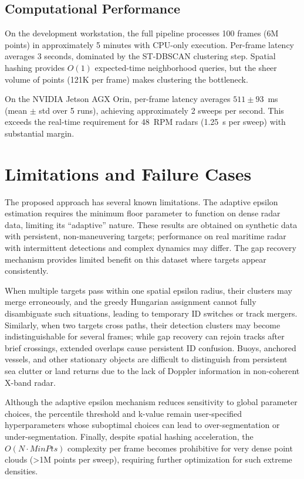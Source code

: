 \documentclass[conf]{new-aiaa}
\begin{document}
\subsection{Computational Performance}

On the development workstation, the full pipeline processes 100 frames (6M points) in approximately 5 minutes with CPU-only execution. Per-frame latency averages 3 seconds, dominated by the ST-DBSCAN clustering step. Spatial hashing provides $O(1)$ expected-time neighborhood queries, but the sheer volume of points (121K per frame) makes clustering the bottleneck.

On the NVIDIA Jetson AGX Orin, per-frame latency averages $511 \pm 93$~ms (mean $\pm$ std over 5 runs), achieving approximately 2 sweeps per second. This exceeds the real-time requirement for 48~RPM radars (1.25~s per sweep) with substantial margin.

\section{Limitations and Failure Cases}

The proposed approach has several known limitations. The adaptive epsilon estimation requires the minimum floor parameter to function on dense radar data, limiting its ``adaptive'' nature. These results are obtained on synthetic data with persistent, non-maneuvering targets; performance on real maritime radar with intermittent detections and complex dynamics may differ. The gap recovery mechanism provides limited benefit on this dataset where targets appear consistently.

When multiple targets pass within one spatial epsilon radius, their clusters may merge erroneously, and the greedy Hungarian assignment cannot fully disambiguate such situations, leading to temporary ID switches or track mergers. Similarly, when two targets cross paths, their detection clusters may become indistinguishable for several frames; while gap recovery can rejoin tracks after brief crossings, extended overlaps cause persistent ID confusion. Buoys, anchored vessels, and other stationary objects are difficult to distinguish from persistent sea clutter or land returns due to the lack of Doppler information in non-coherent X-band radar.

Although the adaptive epsilon mechanism reduces sensitivity to global parameter choices, the percentile threshold and k-value remain user-specified hyperparameters whose suboptimal choices can lead to over-segmentation or under-segmentation. Finally, despite spatial hashing acceleration, the $O(N \cdot \mathit{MinPts})$ complexity per frame becomes prohibitive for very dense point clouds (>1M points per sweep), requiring further optimization for such extreme densities.
\end{document}

